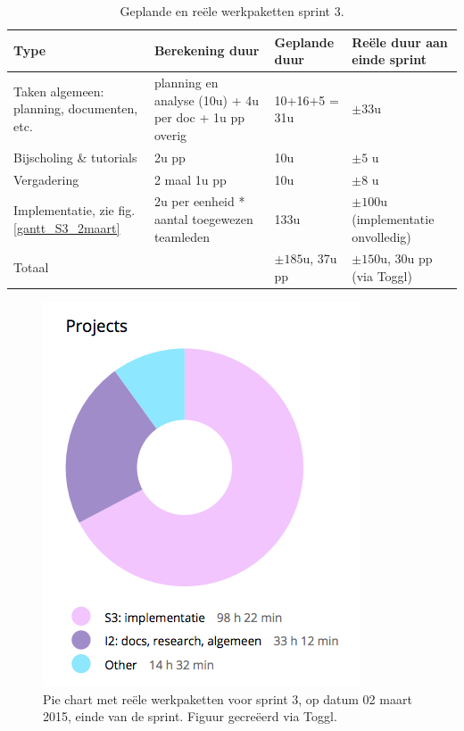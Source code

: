 \documentclass{article}
\begin{document}
\begin{table}[!h] 
  \begin{center}
    \begin{tabular}{|p{4cm}|p{3cm}|p{3cm}|p{3cm}|} 
      \hline
       {\bf Type } &  {\bf Berekening duur} &  {\bf  Geplande duur} &   {\bf Re\"{e}le duur aan einde sprint} \\
           \hline
      Taken algemeen: planning, documenten, etc.& planning en analyse (10u)  + 4u per doc + 1u pp overig & 10+16+5 = 31u & $\pm 33$u  \\
         \hline
         Bijscholing \& tutorials & 2u pp & 10u & $\pm 5$ u \\
           \hline
         Vergadering & 2 maal 1u pp & 10u & $\pm 8$ u \\
         \hline
         Implementatie, zie fig. \ref{gantt_S3_2maart} & 2u per eenheid * aantal toegewezen teamleden & 133u & $\pm 100$u (implementatie onvolledig) \\
   \hline
       Totaal & &  $\pm 185$u,  37u pp & $\pm 150$u, 30u pp (via Toggl) \\
   \hline
    \end{tabular}
  \end{center}
  \caption{Geplande en re\"{e}le werkpaketten sprint 3.}
  \label{tabelS3}
 \end{table}

\begin{figure}[h!]
\centering
 \includegraphics[scale=0.6]{Toggl_Pie_S3.png}
 \caption{Pie chart met re\"{e}le werkpaketten voor sprint 3, op datum 02 maart 2015, einde van de sprint. Figuur gecre\"{e}erd via Toggl. }
 \label{pie_S3}
\end{figure}
\end{document}
